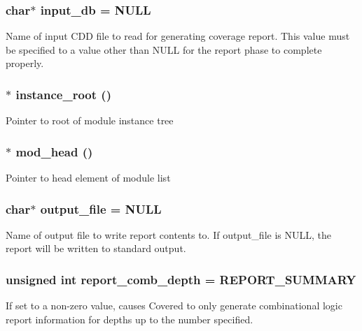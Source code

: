 \subsubsection{\setlength{\rightskip}{0pt plus 5cm}char$\ast$ {\bf input\_\-db} = NULL}\label{report_8c_a11}


Name of input CDD file to read for generating coverage report. This value must be specified to a value other than NULL for the report phase to complete properly. 
\subsubsection{$\ast$ {\bf instance\_\-root} ()}\label{report_8c_a1}


Pointer to root of module instance tree 
\subsubsection{$\ast$ {\bf mod\_\-head} ()}\label{report_8c_a2}


Pointer to head element of module list 
\subsubsection{\setlength{\rightskip}{0pt plus 5cm}char$\ast$ {\bf output\_\-file} = NULL}\label{report_8c_a10}


Name of output file to write report contents to. If output\_\-file is NULL, the report will be written to standard output. 
\subsubsection{\setlength{\rightskip}{0pt plus 5cm}unsigned int {\bf report\_\-comb\_\-depth} = REPORT\_\-SUMMARY}\label{report_8c_a9}


If set to a non-zero value, causes Covered to only generate combinational logic report information for depths up to the number specified. 
